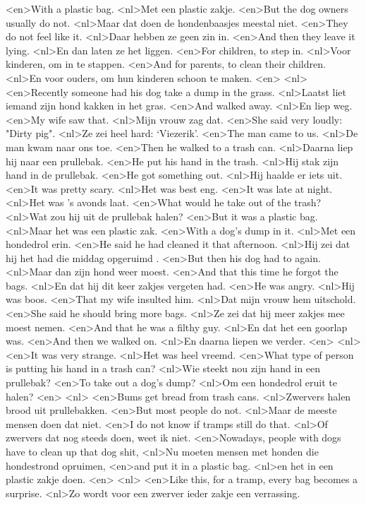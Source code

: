 <en>With a plastic bag.
<nl>Met een plastic zakje.
<en>But the dog owners usually do not.
<nl>Maar dat doen de hondenbaasjes meestal niet.
<en>They do not feel like it.
<nl>Daar hebben ze geen zin in.
<en>And then they leave it lying.
<nl>En dan laten ze het liggen.
<en>For children, to step in.
<nl>Voor kinderen, om in te stappen.
<en>And for parents, to clean their children.
<nl>En voor ouders, om hun kinderen schoon te maken.
<en>
<nl>
<en>Recently someone had his dog take a dump in the grass.
<nl>Laatst liet iemand zijn hond kakken in het gras.
<en>And walked away.
<nl>En liep weg.
<en>My wife saw that.
<nl>Mijn vrouw zag dat.
<en>She said very loudly: "Dirty pig".
<nl>Ze zei heel hard: `Viezerik'.
<en>The man came to us.
<nl>De man kwam naar ons toe.
<en>Then he walked to a trash can.
<nl>Daarna liep hij naar een prullebak.
<en>He put his hand in the trash.
<nl>Hij stak zijn hand in de prullebak.
<en>He got something out.
<nl>Hij haalde er iets uit.
<en>It was pretty scary.
<nl>Het was best eng.
<en>It was late at night.
<nl>Het was 's avonds laat.
<en>What would he take out of the trash?
<nl>Wat zou hij uit de prullebak halen?
<en>But it was a plastic bag.
<nl>Maar het was een plastic zak.
<en>With a dog's dump in it.
<nl>Met een hondedrol erin.
<en>He said he had  cleaned it that afternoon.
<nl>Hij zei dat hij het had die middag opgeruimd .
<en>But then his dog had to again.
<nl>Maar dan zijn hond weer moest.
<en>And that this time he forgot the bags.
<nl>En dat hij dit keer zakjes vergeten had.
<en>He was angry.
<nl>Hij was boos.
<en>That my wife insulted him.
<nl>Dat mijn vrouw hem uitschold.
<en>She said he should bring more bags.
<nl>Ze zei dat hij meer zakjes mee moest nemen.
<en>And that he  was a filthy guy.
<nl>En dat het een goorlap was.
<en>And then we walked on.
<nl>En daarna liepen we verder.
<en>
<nl>
<en>It was very strange.
<nl>Het was heel vreemd.
<en>What type of person is putting his hand in a trash can?
<nl>Wie steekt nou zijn hand in een prullebak?
<en>To take out a dog's dump?
<nl>Om een hondedrol eruit te halen?
<en>
<nl>
<en>Bums get bread from trash cans.
<nl>Zwervers halen brood uit prullebakken.
<en>But most people do not.
<nl>Maar de meeste mensen doen dat niet.
<en>I do not know if tramps still do that.
<nl>Of zwervers dat nog steeds doen, weet ik niet.
<en>Nowadays, people with dogs have to clean up that dog shit,
<nl>Nu moeten mensen met honden die hondestrond opruimen,
<en>and put it in a plastic bag.
<nl>en het in een plastic zakje doen.
<en>
<nl>
<en>Like this, for a tramp, every bag becomes a surprise.
<nl>Zo wordt voor een zwerver ieder zakje  een verrassing.

